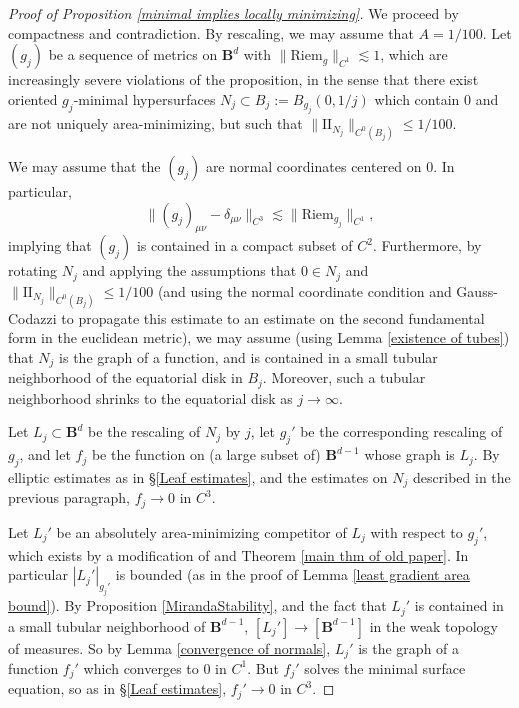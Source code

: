 \documentclass[reqno,11pt]{amsart}
\newcommand{\Ball}{\mathbf{B}}
\newcommand{\Two}{\mathrm{I\!I}}
\newcommand{\Riem}{\mathrm{Riem}}
\theoremstyle{definition}
\numberwithin{equation}{section}
\begin{document}
\begin{proof}[Proof of Proposition \ref{minimal implies locally minimizing}]
We proceed by compactness and contradiction.
By rescaling, we may assume that $A = 1/100$.
Let $(g_j)$ be a sequence of metrics on $\Ball^d$ with $\|\Riem_g\|_{C^1} \lesssim 1$, which are increasingly severe violations of the proposition, in the sense that there exist oriented $g_j$-minimal hypersurfaces $N_j \subset B_j := B_{g_j}(0, 1/j)$ which contain $0$ and are not uniquely area-minimizing, but such that $\|\Two_{N_j}\|_{C^0(B_j)} \leq 1/100$.

We may assume that the $(g_j)$ are normal coordinates centered on $0$.
In particular,
$$\|(g_j)_{\mu \nu} - \delta_{\mu \nu}\|_{C^3} \lesssim \|\Riem_{g_j}\|_{C^1},$$
implying that $(g_j)$ is contained in a compact subset of $C^2$.
Furthermore, by rotating $N_j$ and applying the assumptions that $0 \in N_j$ and $\|\Two_{N_j}\|_{C^0(B_j)} \leq 1/100$ (and using the normal coordinate condition and Gauss-Codazzi to propagate this estimate to an estimate on the second fundamental form in the euclidean metric), we may assume (using Lemma \ref{existence of tubes}) that $N_j$ is the graph of a function, and is contained in a small tubular neighborhood of the equatorial disk in $B_j$.
Moreover, such a tubular neighborhood shrinks to the equatorial disk as $j \to \infty$.

Let $L_j \subset \Ball^d$ be the rescaling of $N_j$ by $j$, let $g_j'$ be the corresponding rescaling of $g_j$, and let $f_j$ be the function on (a large subset of) $\Ball^{d - 1}$ whose graph is $L_j$.
By elliptic estimates as in \S\ref{Leaf estimates}, and the estimates on $N_j$ described in the previous paragraph, $f_j \to 0$ in $C^3$.

Let $L_j'$ be an absolutely area-minimizing competitor of $L_j$ with respect to $g_j'$, which exists by a modification of \cite[Theorem 1.20]{Giusti77} and Theorem \ref{main thm of old paper}.
In particular $|L_j'|_{g_j'}$ is bounded (as in the proof of Lemma \ref{least gradient area bound}).
By Proposition \ref{MirandaStability}, and the fact that $L_j'$ is contained in a small tubular neighborhood of $\Ball^{d - 1}$, $[L_j'] \to [\Ball^{d - 1}]$ in the weak topology of measures.
So by Lemma \ref{convergence of normals}, $L_j'$ is the graph of a function $f_j'$ which converges to $0$ in $C^1$.
But $f_j'$ solves the minimal surface equation, so as in \S\ref{Leaf estimates}, $f_j' \to 0$ in $C^3$.


\end{proof}
\end{document}
